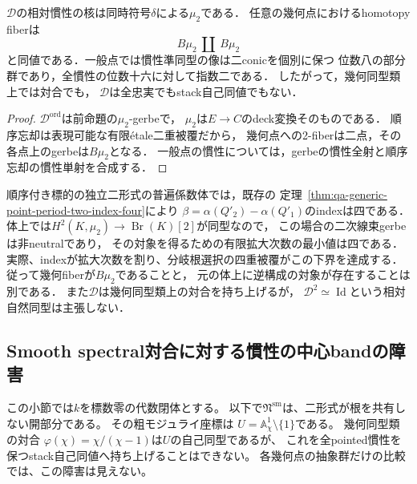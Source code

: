 \begin{corollary}
\label{cor:qa-spectral-relative-two-mu2-gerbes}
$\mathscr D$の相対慣性の核は同時符号$\delta$による$\mu_2$である．
任意の幾何点におけるhomotopy fiberは
\[
 B\mu_2\ \amalg\ B\mu_2
\]
と同値である．一般点では慣性準同型の像は二conicを個別に保つ
位数八の部分群であり，全慣性の位数十六に対して指数二である．
したがって，幾何同型類上では対合でも，
$\mathscr D$は全忠実でもstack自己同値でもない．
\end{corollary}
\begin{proof}
$\mathscr D^{\mathrm{ord}}$は前命題の$\mu_2$-gerbeで，
$\mu_2$は$E\to C$のdeck変換そのものである．
順序忘却は表現可能な有限\'etale二重被覆だから，
幾何点への2-fiberは二点，その各点上のgerbeは$B\mu_2$となる．
一般点の慣性については，gerbeの慣性全射と順序忘却の慣性単射を合成する．
\end{proof}

\begin{remark}[一般点の逆構成に必要な拡大次数]
\label{rem:qa-spectral-relative-gerbe-index-four}
順序付き標的の独立二形式の普遍係数体では，既存の
定理~\ref{thm:qa-generic-point-period-two-index-four}により
$\beta=\alpha(Q'_2)-\alpha(Q'_1)$のindexは四である．
体上では$H^2(K,\mu_2)\to\operatorname{Br}(K)[2]$が同型なので，
この場合の二次線束gerbeは非neutralであり，
その対象を得るための有限拡大次数の最小値は四である．
実際、indexが拡大次数を割り、分岐根選択の四重被覆がこの下界を達成する．
従って幾何fiberが$B\mu_2$であることと，
元の体上に逆構成の対象が存在することは別である．
また$\mathscr D$は幾何同型類上の対合を持ち上げるが，
$\mathscr D^2\simeq\operatorname{Id}$という相対自然同型は主張しない．
\end{remark}

\subsection{Smooth spectral対合に対する慣性の中心bandの障害}
\label{subsec:qa-spectral-center-band-obstruction}

この小節では$k$を標数零の代数閉体とする。
以下で$\mathfrak N^{\mathrm{sm}}$は、二形式が根を共有しない開部分である。
その粗モジュライ座標は
$U=\mathbb A^1_\chi\setminus\{1\}$である。
幾何同型類の対合
$\varphi(\chi)=\chi/(\chi-1)$は$U$の自己同型であるが、
これを全pointed慣性を保つstack自己同値へ持ち上げることはできない。
各幾何点の抽象群だけの比較では、この障害は見えない。

